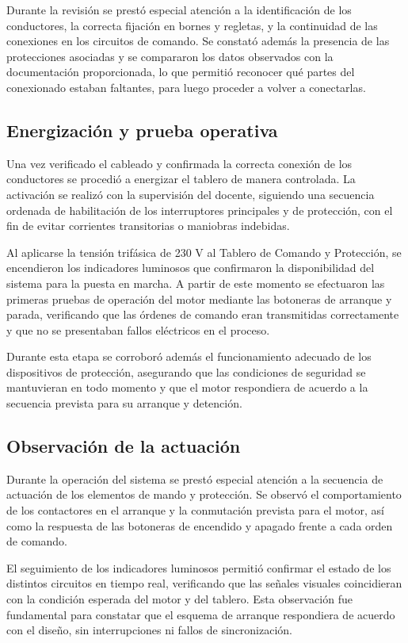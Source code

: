 Durante la revisión se prestó especial atención a la identificación de los conductores, la correcta fijación en bornes y regletas, y la continuidad de las conexiones en los circuitos de comando. Se constató además la presencia de las protecciones asociadas y se compararon los datos observados con la documentación proporcionada, lo que permitió reconocer qué partes del conexionado estaban faltantes, para luego proceder a volver a conectarlas.

\subsection{Energización y prueba operativa}

Una vez verificado el cableado y confirmada la correcta conexión de los conductores se procedió a energizar el tablero de manera controlada. La activación se realizó con la supervisión del docente, siguiendo una secuencia ordenada de habilitación de los interruptores principales y de protección, con el fin de evitar corrientes transitorias o maniobras indebidas.  

Al aplicarse la tensión trifásica de 230 V al Tablero de Comando y Protección, se encendieron los indicadores luminosos que confirmaron la disponibilidad del sistema para la puesta en marcha. A partir de este momento se efectuaron las primeras pruebas de operación del motor mediante las botoneras de arranque y parada, verificando que las órdenes de comando eran transmitidas correctamente y que no se presentaban fallos eléctricos en el proceso.  

Durante esta etapa se corroboró además el funcionamiento adecuado de los dispositivos de protección, asegurando que las condiciones de seguridad se mantuvieran en todo momento y que el motor respondiera de acuerdo a la secuencia prevista para su arranque y detención.

\subsection{Observación de la actuación}

Durante la operación del sistema se prestó especial atención a la secuencia de actuación de los elementos de mando y protección. Se observó el comportamiento de los contactores en el arranque y la conmutación prevista para el motor, así como la respuesta de las botoneras de encendido y apagado frente a cada orden de comando.  

El seguimiento de los indicadores luminosos permitió confirmar el estado de los distintos circuitos en tiempo real, verificando que las señales visuales coincidieran con la condición esperada del motor y del tablero. Esta observación fue fundamental para constatar que el esquema de arranque respondiera de acuerdo con el diseño, sin interrupciones ni fallos de sincronización.  


